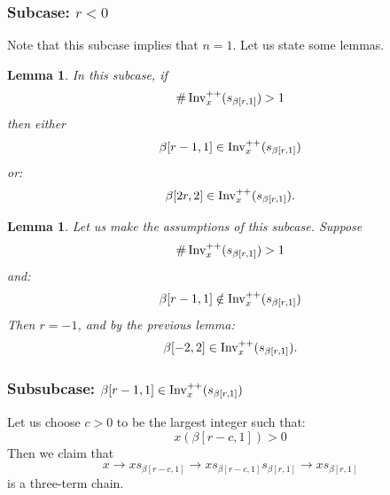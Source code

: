 \documentclass[10pt]{amsart}
\newtheorem{lemm}[theo]{Lemma}
\begin{document}
\subsubsection{Subcase: \texorpdfstring{$r < 0$}{r < 0}}

Note that this subcase implies that $n=1$. Let us state some lemmas.

\begin{lemm}
In this subcase, if
\begin{equation}\label{eq:64}
\# \Invplusplusx(s_{\beta[r,1]}) > 1
\end{equation}
then either
\begin{equation}\label{eq:65}
\beta[r-1,1] \in \Invplusplusx(s_{\beta[r,1]})
\end{equation}
or:
\begin{equation}\label{eq:66}
\beta[2r,2] \in \Invplusplusx(s_{\beta[r,1]}).
\end{equation}
\end{lemm}

\begin{lemm}
Let us make the assumptions of this subcase. Suppose
\begin{equation}\label{eq:064}
\# \Invplusplusx(s_{\beta[r,1]}) > 1
\end{equation}
and:
\begin{equation}\label{eq:065}
\beta[r-1,1] \notin \Invplusplusx(s_{\beta[r,1]})
\end{equation}
Then $r = -1$, and by the previous lemma:
\begin{equation}\label{eq:67}
\beta[-2,2] \in \Invplusplusx(s_{\beta[r,1]}).
\end{equation}
\end{lemm}

\subsubsection*{Subsubcase: $\beta[r-1,1] \in \operatorname{Inv}^{++}_x(s_{\beta[r,1]})$}

Let us choose $c>0$ to be the largest integer such that:
\begin{equation}\label{eq:60}
x(\beta[r-c,1]) > 0
\end{equation}
Then we claim that
\begin{equation}\label{eq:62}
x \rightarrow x s_{\beta[r-c,1]} \rightarrow x s_{\beta[r-c,1]} s_{\beta[r,1]} \rightarrow x s_{\beta[r,1]}
\end{equation}
is a three-term chain.
\end{document}
